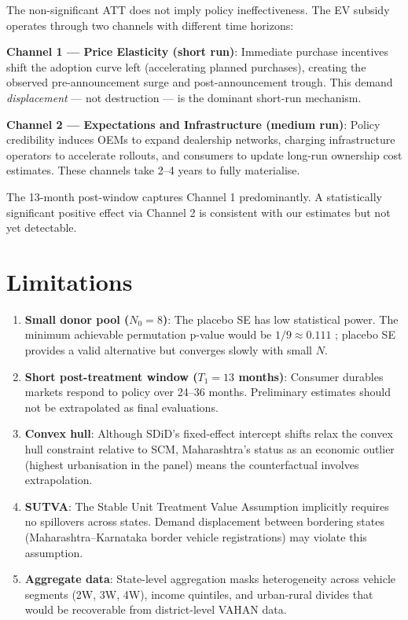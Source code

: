\documentclass[journal]{IEEEtran}
\begin{document}
The non-significant ATT does not imply policy ineffectiveness. The EV 
subsidy operates through two channels with different time horizons:

\textbf{Channel 1 — Price Elasticity (short run)}: Immediate purchase 
incentives shift the adoption curve left (accelerating planned purchases),
creating the observed pre-announcement surge and post-announcement trough.
This demand \emph{displacement} — not destruction — is the dominant 
short-run mechanism.

\textbf{Channel 2 — Expectations and Infrastructure (medium run)}: Policy
credibility induces OEMs to expand dealership networks, charging 
infrastructure operators to accelerate rollouts, and consumers to 
update long-run ownership cost estimates. These channels take 2--4 years 
to fully materialise.

The 13-month post-window captures Channel 1 predominantly. A statistically
significant positive effect via Channel 2 is consistent with our estimates 
but not yet detectable.

\section{Limitations}
\label{sec:limitations}

\begin{enumerate}
  \item \textbf{Small donor pool ($N_0 = 8$)}: The placebo SE has low 
        statistical power. The minimum achievable permutation 
        p-value would be $1/9 \approx 0.111$ 
        \citep{Abadie2010}; placebo SE provides a valid alternative but 
        converges slowly with small $N$.
  
  \item \textbf{Short post-treatment window ($T_1 = 13$ months)}: 
        Consumer durables markets respond to policy over 24--36 months. 
        Preliminary estimates should not be extrapolated as final 
        evaluations.
  
  \item \textbf{Convex hull}: Although SDiD's fixed-effect intercept 
        shifts relax the convex hull constraint relative to SCM, 
        Maharashtra's status as an economic outlier (highest urbanisation 
        in the panel) means the counterfactual involves extrapolation.
  
  \item \textbf{SUTVA}: The Stable Unit Treatment Value Assumption 
        implicitly requires no spillovers across states. Demand displacement 
        between bordering states (Maharashtra–Karnataka border vehicle 
        registrations) may violate this assumption.
  
  \item \textbf{Aggregate data}: State-level aggregation masks 
        heterogeneity across vehicle segments (2W, 3W, 4W), income 
        quintiles, and urban-rural divides that would be recoverable from 
        district-level VAHAN data.
\end{enumerate}
\end{document}
